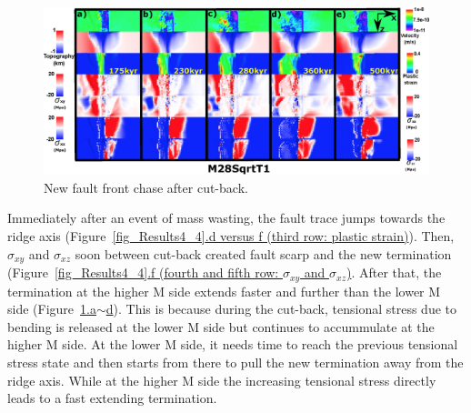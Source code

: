 \begin{figure}[h]
  \centering
    \includegraphics[width=1.0\textwidth]{./Figures/fig_Results4_9_sqrt_cut_back_new_fault_chase.eps}
  \caption{New fault front chase after cut-back.}
 \label{fig_Results4_9}
\end{figure}

Immediately after an event of mass wasting, the fault trace jumps towards the ridge axis (Figure~\hyperref[fig_Results4_4]{\ref{fig_Results4_4}.d versus f (third row: plastic strain)}). 
Then, $\sigma_{xy}$ and $\sigma_{xz}$ soon  between cut-back created fault scarp and the new termination (Figure~\hyperref[fig_Results4_4]{\ref{fig_Results4_4}.f (fourth and fifth row: $\sigma_{xy}$ and $\sigma_{xz}$)}. 
After that, the termination at the higher M side extends faster and further than the lower M side (Figure~\hyperref[fig_Results4_9]{\ref{fig_Results4_9}.a$\sim$d}). This is because during the cut-back, tensional stress due to bending is released at the lower M side but continues to accummulate at the higher M side. At the lower M side, it needs time to reach the previous tensional stress state and then starts from there to pull the new termination away from the ridge axis. While at the higher M side the increasing tensional stress directly leads to a fast extending termination.


